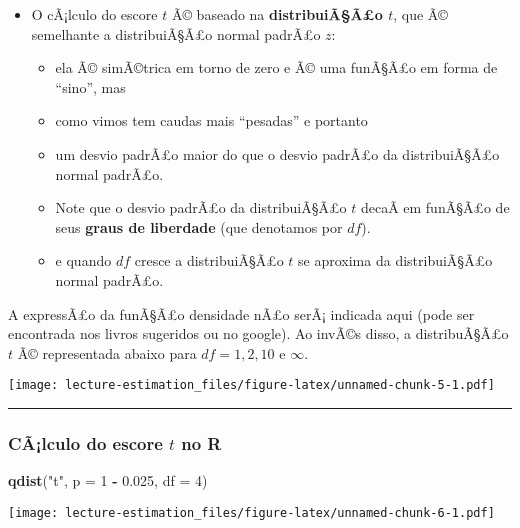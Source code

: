 \documentclass[]{article}
\newenvironment{Shaded}{\begin{snugshade}}{\end{snugshade}}
\newcommand{\KeywordTok}[1]{\textcolor[rgb]{0.13,0.29,0.53}{\textbf{#1}}}
\newcommand{\DataTypeTok}[1]{\textcolor[rgb]{0.13,0.29,0.53}{#1}}
\newcommand{\DecValTok}[1]{\textcolor[rgb]{0.00,0.00,0.81}{#1}}
\newcommand{\FloatTok}[1]{\textcolor[rgb]{0.00,0.00,0.81}{#1}}
\newcommand{\StringTok}[1]{\textcolor[rgb]{0.31,0.60,0.02}{#1}}
\newcommand{\OperatorTok}[1]{\textcolor[rgb]{0.81,0.36,0.00}{\textbf{#1}}}
\newcommand{\NormalTok}[1]{#1}
\providecommand{\tightlist}{%
  \setlength{\itemsep}{0pt}\setlength{\parskip}{0pt}}
\begin{document}
\begin{itemize}
\tightlist
\item
  O cÃ¡lculo do escore \(t\) Ã© baseado na \textbf{distribuiÃ§Ã£o
  \(t\)}, que Ã© semelhante a distribuiÃ§Ã£o normal padrÃ£o \(z\):

  \begin{itemize}
  \tightlist
  \item
    ela Ã© simÃ©trica em torno de zero e Ã© uma funÃ§Ã£o em forma de
    ``sino'', mas
  \item
    como vimos tem caudas mais ``pesadas'' e portanto
  \item
    um desvio padrÃ£o maior do que o desvio padrÃ£o da distribuiÃ§Ã£o
    normal padrÃ£o.
  \item
    Note que o desvio padrÃ£o da distribuiÃ§Ã£o \(t\) decaÃ­ em funÃ§Ã£o
    de seus \textbf{graus de liberdade} (que denotamos por \(df\)).
  \item
    e quando \(df\) cresce a distribuiÃ§Ã£o \(t\) se aproxima da
    distribuiÃ§Ã£o normal padrÃ£o.
  \end{itemize}
\end{itemize}

A expressÃ£o da funÃ§Ã£o densidade nÃ£o serÃ¡ indicada aqui (pode ser
encontrada nos livros sugeridos ou no google). Ao invÃ©s disso, a
distribuÃ§Ã£o \(t\) Ã© representada abaixo para \(df =1,2,10\) e
\(\infty\).

\texttt{[image: lecture-estimation\_files/figure-latex/unnamed-chunk-5-1.pdf]}

\begin{center}\rule{0.5\linewidth}{\linethickness}\end{center}

\subsubsection{\texorpdfstring{CÃ¡lculo do escore \(t\) no
\textbf{R}}{CÃ¡lculo do escore t no R}}\label{calculo-do-escore-t-no-r}

\begin{Shaded}
\begin{Highlighting}[]
\KeywordTok{qdist}\NormalTok{(}\StringTok{"t"}\NormalTok{, }\DataTypeTok{p =} \DecValTok{1} \OperatorTok{-}\StringTok{ }\FloatTok{0.025}\NormalTok{, }\DataTypeTok{df =} \DecValTok{4}\NormalTok{)}
\end{Highlighting}
\end{Shaded}

\texttt{[image: lecture-estimation\_files/figure-latex/unnamed-chunk-6-1.pdf]}
\end{document}
